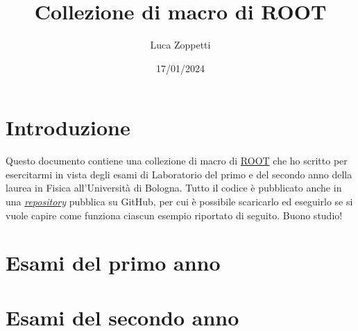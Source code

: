 \documentclass{article}
\title{Collezione di macro di ROOT}
\author{Luca Zoppetti}
\date{17/01/2024}
\begin{document}
\maketitle

\tableofcontents

\section*{Introduzione}
Questo documento contiene una collezione di macro di \href{https://root.cern}{ROOT} che ho scritto per esercitarmi in vista degli esami di Laboratorio del primo e del secondo anno della laurea in Fisica all'Università di Bologna. Tutto il codice è pubblicato anche in una \href{https://github.com/LuckeeDev/root}{\emph{repository}} pubblica su GitHub, per cui è possibile scaricarlo ed eseguirlo se si vuole capire come funziona ciascun esempio riportato di seguito. Buono studio!

\section{Esami del primo anno}















\section{Esami del secondo anno}

\end{document}
